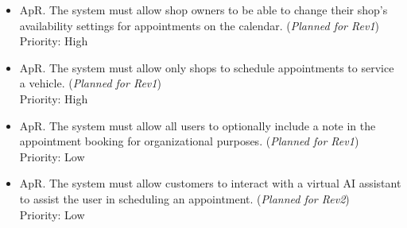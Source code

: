 \documentclass[12pt]{article}
\newcounter{appreqnum} %
\newcounter{workreqnum} %
\newcommand{\rev}[1]{(\textit{Planned for Rev#1})}
\begin{document}
\begin {itemize}
    \item[ApR\refstepcounter{appreqnum}\theappreqnum \label{R_Output}.] The system must allow shop owners to be able to change their shop's availability settings for appointments on the calendar. \rev{1} \\
    Priority: High
    
    \item[ApR\refstepcounter{appreqnum}\theappreqnum \label{R_Output}.] The system must allow only shops to schedule appointments to service a vehicle. \rev{1} \\
    Priority: High
    
    
    \item[ApR\refstepcounter{appreqnum}\theappreqnum \label{R_Output}.] The system must allow all users to optionally include a note in the appointment booking for organizational purposes. \rev{1} \\
    Priority: Low
    
    \item[ApR\refstepcounter{appreqnum}\theappreqnum \label{R_Output}.] The system must allow customers to interact with a virtual AI assistant to assist the user in scheduling an appointment. \rev{2} \\
    Priority: Low
    
\end {itemize}



    
\end{document}
